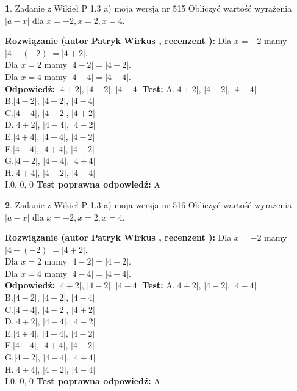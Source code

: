 \documentclass[12pt, a4paper]{article}
\theoremstyle{definition} %
\newtheorem{zad}{}
\newcommand{\zadStart}[1]{\begin{zad}#1\newline}
\newcommand{\zadStop}{\end{zad}}
\newcommand{\rozwStart}[2]{\noindent \textbf{Rozwiązanie (autor #1 , recenzent #2): }\newline}
\newcommand{\rozwStop}{\newline}
\newcommand{\odpStart}{\noindent \textbf{Odpowiedź:}\newline}
\newcommand{\odpStop}{\newline}
\newcommand{\testStart}{\noindent \textbf{Test:}\newline}
\newcommand{\testStop}{\newline}
\newcommand{\kluczStart}{\noindent \textbf{Test poprawna odpowiedź:}\newline}
\newcommand{\kluczStop}{\newline}
\begin{document}
\zadStart{Zadanie z Wikieł P 1.3 a) moja wersja nr 515}
Obliczyć wartość wyrażenia $|a - x|$ dla $x=-2,x=2,x=4$.
\zadStop
\rozwStart{Patryk Wirkus}{}
Dla $x = -2$ mamy $|4 - (-2)| = |4 + 2|$.\\
Dla $x = 2$ mamy $|4 - 2| = |4 - 2|$.\\
Dla $x = 4$ mamy $|4 - 4| = |4 - 4|$.\\
\rozwStop
\odpStart
$|4 + 2|$, $|4 - 2|$, $|4 - 4|$
\odpStop
\testStart
A.$|4 + 2|$, $|4 - 2|$, $|4 - 4|$\\
B.$|4 - 2|$, $|4 + 2|$, $|4 - 4|$\\
C.$|4 - 4|$, $|4 - 2|$, $|4 + 2|$\\
D.$|4 + 2|$, $|4 - 4|$, $|4 - 2|$\\
E.$|4 + 4|$, $|4 - 4|$, $|4 - 2|$\\
F.$|4 - 4|$, $|4 + 4|$, $|4 - 2|$\\
G.$|4 - 2|$, $|4 - 4|$, $|4 + 4|$\\
H.$|4 + 4|$, $|4 - 2|$, $|4 - 4|$\\
I.$0$, $0$, $0$
\testStop
\kluczStart
A
\kluczStop



\zadStart{Zadanie z Wikieł P 1.3 a) moja wersja nr 516}
Obliczyć wartość wyrażenia $|a - x|$ dla $x=-2,x=2,x=4$.
\zadStop
\rozwStart{Patryk Wirkus}{}
Dla $x = -2$ mamy $|4 - (-2)| = |4 + 2|$.\\
Dla $x = 2$ mamy $|4 - 2| = |4 - 2|$.\\
Dla $x = 4$ mamy $|4 - 4| = |4 - 4|$.\\
\rozwStop
\odpStart
$|4 + 2|$, $|4 - 2|$, $|4 - 4|$
\odpStop
\testStart
A.$|4 + 2|$, $|4 - 2|$, $|4 - 4|$\\
B.$|4 - 2|$, $|4 + 2|$, $|4 - 4|$\\
C.$|4 - 4|$, $|4 - 2|$, $|4 + 2|$\\
D.$|4 + 2|$, $|4 - 4|$, $|4 - 2|$\\
E.$|4 + 4|$, $|4 - 4|$, $|4 - 2|$\\
F.$|4 - 4|$, $|4 + 4|$, $|4 - 2|$\\
G.$|4 - 2|$, $|4 - 4|$, $|4 + 4|$\\
H.$|4 + 4|$, $|4 - 2|$, $|4 - 4|$\\
I.$0$, $0$, $0$
\testStop
\kluczStart
A
\kluczStop
\end{document}
